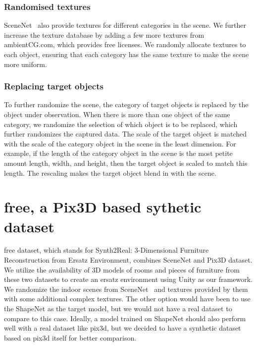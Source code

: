 \subsubsection{Randomised textures}
SceneNet~\cite{McCormac:etal:ICCV2017} also provide textures for different categories in the scene.
We further increase the texture database by adding a few more textures from ambientCG.com, which provides free licenses.
We randomly allocate textures to each object, ensuring that each category has the same texture to make the scene more uniform.

\subsubsection{Replacing target objects}
To further randomize the scene, the category of target objects is replaced by the object under observation.
When there is more than one object of the same category, we randomize the selection of which object is to be replaced,
which further randomizes the captured data.
The scale of the target object is matched with the scale of the category object in the scene in the least dimension.
For example, if the length of the category object in the scene is the most petite amount length, width, and height, then the target object is scaled to match this length.
The rescaling makes the target object blend in with the scene.

\section{\gls{free}, a Pix3D based sythetic dataset}\label{sec:s2r:3d-free-a-pix3d-based-synthetic-dataset}

\gls{free} dataset, which stands for Synth2Real: 3-Dimensional Furniture Reconstruction from Ersatz Environment, combines SceneNet and Pix3D dataset.
We utilize the availability of 3D models of rooms and pieces of furniture from these two datasets to create an ersatz environment using Unity as our framework.
We randomize the indoor scenes from SceneNet~\cite{McCormac:etal:ICCV2017} and textures provided by them with some additional complex textures.
The other option would have been to use the ShapeNet as the target model, but we would not have a real dataset to compare to this case.
Ideally, a model trained on ShapeNet should also perform well with a real dataset like pix3d, but we decided to have a synthetic dataset based on pix3d itself for better comparison.

